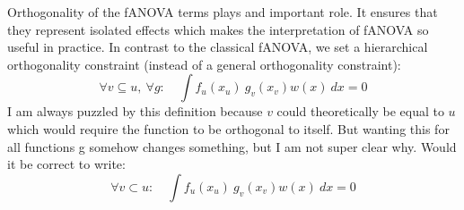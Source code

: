 Orthogonality of the fANOVA terms plays and important role. It ensures that they represent isolated effects which makes the interpretation of fANOVA so useful in practice.
In contrast to the classical fANOVA, we set a hierarchical orthogonality constraint (instead of a general orthogonality constraint):
\begin{equation}
\forall v \subseteq u,\ \forall g:\quad 
\int f_u(x_u)\ g_v(x_v) w(x)\ dx = 0
\label{eq:orthogonality_generalized}
\end{equation}
{\color{blue} I am always puzzled by this definition because $v$ could theoretically be equal to $u$ which would require the function to be orthogonal to itself. But wanting this for all functions g somehow changes something, but I am not super clear why. Would it be correct to write:}
\begin{equation}
\forall v \subset u :\quad 
\int f_u(x_u)\ g_v(x_v) w(x)\ dx = 0
\label{eq:orthogonality_generalized}
\end{equation}


